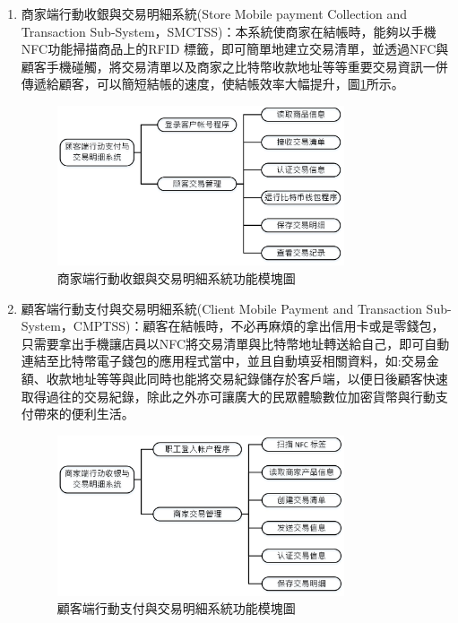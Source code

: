 \begin{enumerate}
		\item 商家端行動收銀與交易明細系統(Store Mobile payment Collection and Transaction Sub-System，SMCTSS)：本系統使商家在結帳時，能夠以手機NFC功能掃描商品上的RFID 標籤，即可簡單地建立交易清單，並透過NFC與顧客手機碰觸，將交易清單以及商家之比特幣收款地址等等重要交易資訊一併傳遞給顧客，可以簡短結帳的速度，使結帳效率大幅提升，圖\ref{model2}所示。
		 
			\begin{figure}[!htbp]
			\centering
			\includegraphics[width = 0.8\textwidth]{model2.jpg}
			\caption{商家端行動收銀與交易明細系統功能模塊圖}\label{model2}
			\end{figure}


		\item 顧客端行動支付與交易明細系統(Client Mobile Payment and Transaction Sub-System，CMPTSS)：顧客在結帳時，不必再麻煩的拿出信用卡或是零錢包，只需要拿出手機讓店員以NFC將交易清單與比特幣地址轉送給自己，即可自動連結至比特幣電子錢包的應用程式當中，並且自動填妥相關資料，如:交易金額、收款地址等等與此同時也能將交易紀錄儲存於客戶端，以便日後顧客快速取得過往的交易紀錄，除此之外亦可讓廣大的民眾體驗數位加密貨幣與行動支付帶來的便利生活。
			\begin{figure}[!htbp]
			\centering
			\includegraphics[width = 0.8\textwidth]{model3.jpg}
			\caption{顧客端行動支付與交易明細系統功能模塊圖}\label{model3}
			\end{figure}
		
	\end{enumerate}
